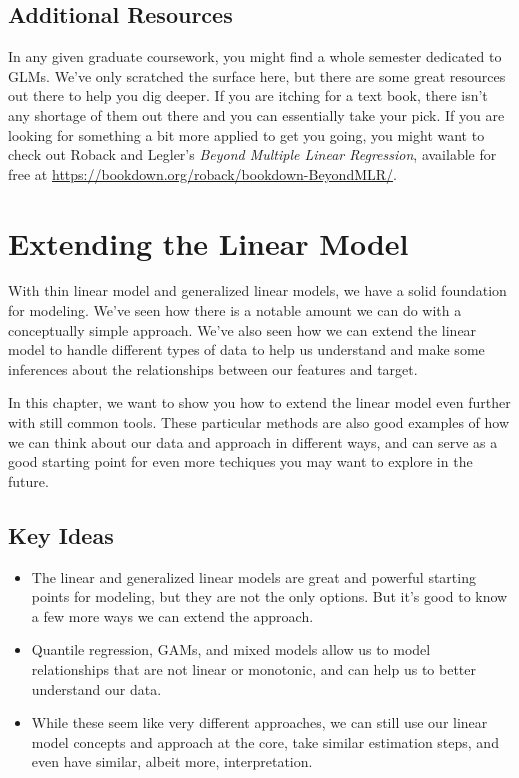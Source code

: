 \documentclass[
  letterpaper,
]{krantz}
\providecommand{\tightlist}{%
  \setlength{\itemsep}{0pt}\setlength{\parskip}{0pt}}\usepackage{longtable,booktabs,array}
\begin{document}
\section{Additional Resources}\label{sec-glm-resources}

In any given graduate coursework, you might find a whole semester
dedicated to GLMs. We've only scratched the surface here, but there are
some great resources out there to help you dig deeper. If you are
itching for a text book, there isn't any shortage of them out there and
you can essentially take your pick. If you are looking for something a
bit more applied to get you going, you might want to check out Roback
and Legler's \emph{Beyond Multiple Linear Regression}, available for
free at \url{https://bookdown.org/roback/bookdown-BeyondMLR/}.

\chapter{Extending the Linear Model}\label{sec-lm-extend}

With thin linear model and generalized linear models, we have a solid
foundation for modeling. We've seen how there is a notable amount we can
do with a conceptually simple approach. We've also seen how we can
extend the linear model to handle different types of data to help us
understand and make some inferences about the relationships between our
features and target.

In this chapter, we want to show you how to extend the linear model even
further with still common tools. These particular methods are also good
examples of how we can think about our data and approach in different
ways, and can serve as a good starting point for even more techiques you
may want to explore in the future.

\section{Key Ideas}\label{sec-lm-extend-key-ideas}

\begin{itemize}
\tightlist
\item
  The linear and generalized linear models are great and powerful
  starting points for modeling, but they are not the only options. But
  it's good to know a few more ways we can extend the approach.
\item
  Quantile regression, GAMs, and mixed models allow us to model
  relationships that are not linear or monotonic, and can help us to
  better understand our data.
\item
  While these seem like very different approaches, we can still use our
  linear model concepts and approach at the core, take similar
  estimation steps, and even have similar, albeit more, interpretation.
\end{itemize}
\end{document}
